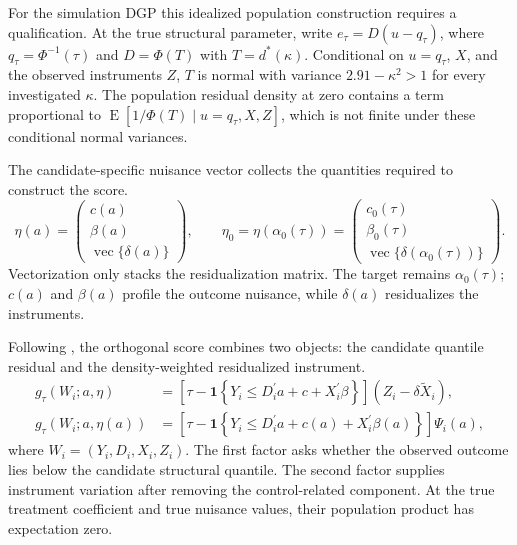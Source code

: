 For the simulation DGP this idealized population construction requires a qualification. At the true structural parameter, write $e_\tau=D(u-q_\tau)$, where $q_\tau=\Phi^{-1}(\tau)$ and $D=\Phi(T)$ with $T=d^*(\kappa)$. Conditional on $u=q_\tau$, $X$, and the observed instruments $Z$, $T$ is normal with variance $2.91-\kappa^2>1$ for every investigated $\kappa$. The population residual density at zero contains a term proportional to $\operatorname{E}[1/\Phi(T)\mid u=q_\tau,X,Z]$, which is not finite under these conditional normal variances.

The candidate-specific nuisance vector collects the quantities required to construct the score.
\begin{equation}
    \eta(a)
    =
    \begin{pmatrix}
        c(a)\\
        \beta(a)\\
        \operatorname{vec}\{\delta(a)\}
    \end{pmatrix},
    \qquad
    \eta_0
    =
    \eta\!\left(\alpha_0(\tau)\right)
    =
    \begin{pmatrix}
        c_0(\tau)\\
        \beta_0(\tau)\\
        \operatorname{vec}\{\delta(\alpha_0(\tau))\}
    \end{pmatrix}.
    \label{eq:profile-eta}
\end{equation}
Vectorization only stacks the residualization matrix. The target remains $\alpha_0(\tau)$; $c(a)$ and $\beta(a)$ profile the outcome nuisance, while $\delta(a)$ residualizes the instruments.

Following \textcite{chen_huang_tien_2021}, the orthogonal score combines two objects: the candidate quantile residual and the density-weighted residualized instrument.
\begin{equation}
    \begin{aligned}
        g_{\tau}(W_i;a,\eta)
        &=
        \left[
            \tau-\mathbf{1}\!\left\{
                Y_i\leq D_i^{\prime}a+c+X_i^{\prime}\beta
            \right\}
        \right]
        \left(Z_i-\delta\widetilde X_i\right),\\
        g_{\tau}(W_i;a,\eta(a))
        &=
        \left[
            \tau-\mathbf{1}\!\left\{
                Y_i\leq D_i^{\prime}a+c(a)+X_i^{\prime}\beta(a)
            \right\}
        \right]\Psi_i(a),
    \end{aligned}
    \label{eq:orthogonal-score}
\end{equation}
where $W_i=(Y_i,D_i,X_i,Z_i)$. The first factor asks whether the observed outcome lies below the candidate structural quantile. The second factor supplies instrument variation after removing the control-related component. At the true treatment coefficient and true nuisance values, their population product has expectation zero.

